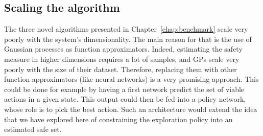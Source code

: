 \subsection{Scaling the algorithm}
The three novel algorithms presented in Chapter~\ref{chap:benchmark} scale very poorly with the system's dimensionality. The main reason for that is the use of Gaussian processes as function approximators. Indeed, estimating the safety measure in higher dimensions requires a lot of samples, and GPs scale very poorly with the size of their dataset. Therefore, replacing them with other function approximators (like neural networks) is a very promising approach. This could be done for example by having a first network predict the set of viable actions in a given state. This output could then be fed into a policy network, whose role is to pick the best action. Such an architecture would extend the idea that we have explored here of constraining the exploration policy into an estimated safe set.